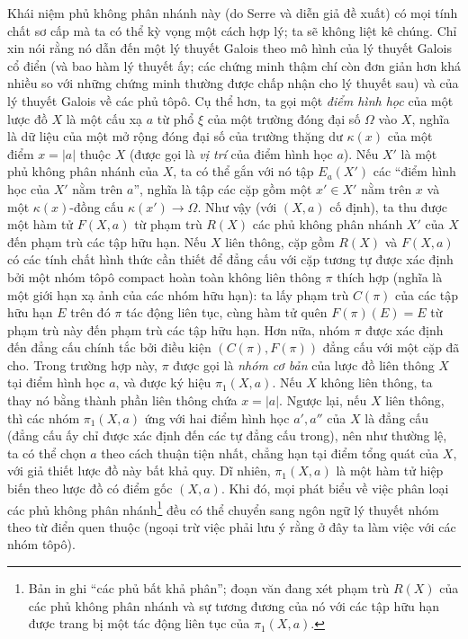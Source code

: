 Khái niệm phủ không phân nhánh này (do Serre và diễn giả đề xuất) có mọi tính
chất sơ cấp mà ta có thể kỳ vọng một cách hợp lý; ta sẽ không liệt kê chúng.
Chỉ xin nói rằng nó dẫn đến một lý thuyết Galois theo mô hình của lý thuyết
Galois cổ điển (và bao hàm lý thuyết ấy; các chứng minh thậm chí còn đơn giản
hơn khá nhiều so với những chứng minh thường được chấp nhận cho lý thuyết sau) và của lý thuyết
Galois về các phủ tôpô. Cụ thể hơn, ta gọi một \emph{điểm hình học} của một
lược đồ $X$ là một cấu xạ $a$ từ phổ $\xi$ của một trường đóng đại số $\Omega$
vào $X$, nghĩa là dữ liệu của một mở rộng đóng đại số của trường thặng dư
$\kappa(x)$ của một điểm $x=|a|$ thuộc $X$ (được gọi là \emph{vị trí} của
điểm hình học $a$). Nếu $X'$ là một phủ không phân nhánh của $X$, ta có thể
gắn với nó tập $E_a(X')$ các “điểm hình học của $X'$ nằm trên $a$”, nghĩa là
tập các cặp gồm một $x'\in X'$ nằm trên $x$ và một $\kappa(x)$-đồng cấu
$\kappa(x')\longrightarrow\Omega$. Như vậy (với $(X,a)$ cố định), ta thu được
một hàm tử $F(X,a)$ từ phạm trù $R(X)$ các phủ không phân nhánh $X'$ của $X$
đến phạm trù các tập hữu hạn. Nếu $X$ liên thông, cặp gồm $R(X)$ và $F(X,a)$
có các tính chất hình thức cần thiết để đẳng cấu với cặp tương tự được xác định
bởi một nhóm tôpô compact hoàn toàn không liên thông $\pi$ thích hợp (nghĩa là
một giới hạn xạ ảnh của các nhóm hữu hạn): ta lấy phạm trù $C(\pi)$ của các tập
hữu hạn $E$ trên đó $\pi$ tác động liên tục, cùng hàm tử quên
$F(\pi)(E)=E$ từ phạm trù này đến phạm trù các tập hữu hạn. Hơn nữa, nhóm
$\pi$ được xác định đến đẳng cấu chính tắc bởi điều kiện $(C(\pi),F(\pi))$
đẳng cấu với một cặp đã cho. Trong trường hợp này, $\pi$ được gọi là
\emph{nhóm cơ bản} của lược đồ liên thông $X$ tại điểm hình học $a$, và được
ký hiệu $\pi_1(X,a)$. Nếu $X$ không liên thông, ta thay nó bằng thành phần liên
thông chứa $x=|a|$. Ngược lại, nếu $X$ liên thông, thì các nhóm $\pi_1(X,a)$
ứng với hai điểm hình học $a',a''$ của $X$ là đẳng cấu (đẳng cấu ấy chỉ được
xác định đến các tự đẳng cấu trong), nên như thường lệ, ta có thể chọn $a$
theo cách thuận tiện nhất, chẳng hạn tại điểm tổng quát của $X$, với giả thiết
lược đồ này bất khả quy. Dĩ nhiên, $\pi_1(X,a)$ là một hàm tử hiệp biến theo lược
đồ có điểm gốc $(X,a)$. Khi đó, mọi phát biểu về việc phân loại các phủ không
phân nhánh\footnote{Bản in ghi “các phủ bất khả phân”; đoạn văn đang xét phạm
trù $R(X)$ của các phủ không phân nhánh và sự tương đương của nó với các tập
hữu hạn được trang bị một tác động liên tục của $\pi_1(X,a)$.} đều có thể
chuyển sang ngôn ngữ lý thuyết nhóm theo từ điển quen thuộc (ngoại trừ việc
phải lưu ý rằng ở đây ta làm việc với các nhóm tôpô).

